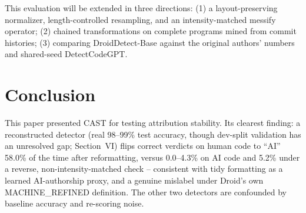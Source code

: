 \documentclass[10pt,conference]{IEEEtran}
\begin{document}
This evaluation will be extended in three directions: (1) a layout-preserving normalizer, length-controlled resampling, and an intensity-matched messify operator; (2) chained transformations on complete programs mined from commit histories; (3) comparing DroidDetect-Base against the original authors' numbers and shared-seed DetectCodeGPT.

\section{Conclusion}

This paper presented CAST for testing attribution stability. Its clearest finding: a reconstructed detector (real 98--99\% test accuracy, though dev-split validation has an unresolved gap; Section~VI) flips correct verdicts on human code to ``AI'' 58.0\% of the time after reformatting, versus 0.0--4.3\% on AI code and 5.2\% under a reverse, non-intensity-matched check -- consistent with tidy formatting as a learned AI-authorship proxy, and a genuine mislabel under Droid's own MACHINE\_REFINED definition. The other two detectors are confounded by baseline accuracy and re-scoring noise.
\end{document}
